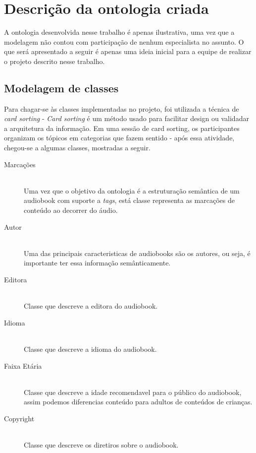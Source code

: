 \section{Descrição da ontologia criada}

A ontologia desenvolvida nesse trabalho é apenas ilustrativa, uma vez que a modelagem não contou com participação de nenhum especialista no assunto. O que será apresentado a seguir é apenas uma ideia inicial para a equipe de realizar o projeto descrito nesse trabalho. 

\subsection{Modelagem de classes}

Para chagar-se às classes implementadas no projeto, foi utilizada a técnica de \textit{card sorting} - \textit{Card sorting} é um método usado para facilitar design ou validadar a arquitetura da informação. Em uma sessão de card sorting, os participantes organizam os tópicos em categorias que fazem sentido \cite{cardsorting} - após essa atividade, chegou-se a algumas classes, mostradas a seguir.

\begin{description}
  \item[Marcações] \hfill \\
  Uma vez que o objetivo da ontologia é a estruturação semântica de um audiobook com suporte a \textit{tags}, está classe representa as marcações de conteúdo ao decorrer do áudio.
  \item[Autor] \hfill \\
  Uma das principais caracteristicas de audiobooks são os autores, ou seja, é importante ter essa informação semânticamente.
  \item[Editora] \hfill \\
  Classe que descreve a editora do audiobook.
  \item[Idioma] \hfill \\
  Classe que descreve a idioma do audiobook.
  \item[Faixa Etária] \hfill \\
  Classe que descreve a idade recomendavel para o público do audiobook, assim podemos diferencias conteúdo para adultos de conteúdos de crianças.
  \item[Copyright] \hfill \\
  Classe que descreve os diretiros sobre o audiobook.
\end{description}


